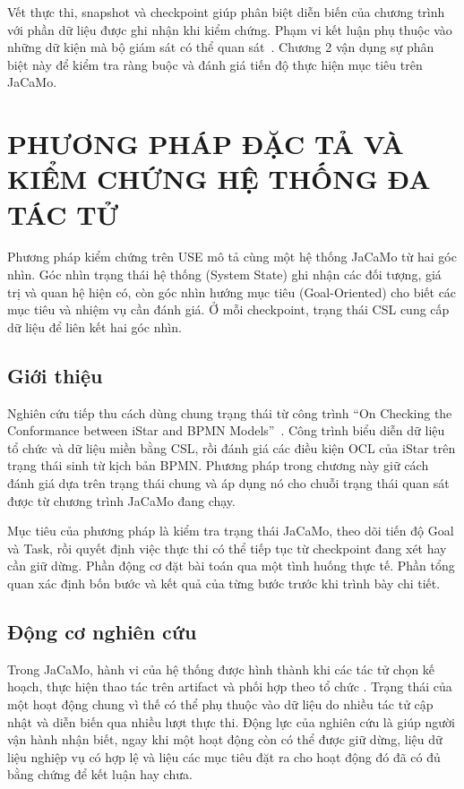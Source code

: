\documentclass[12pt,a4paper,oneside]{extreport}
\begin{document}
Vết thực thi, snapshot và checkpoint giúp phân biệt diễn biến của chương trình với phần dữ liệu được ghi nhận khi kiểm chứng. Phạm vi kết luận phụ thuộc vào những dữ kiện mà bộ giám sát có thể quan sát~\cite{ref-23}. Chương 2 vận dụng sự phân biệt này để kiểm tra ràng buộc và đánh giá tiến độ thực hiện mục tiêu trên JaCaMo.

\chapter{PHƯƠNG PHÁP ĐẶC TẢ VÀ KIỂM CHỨNG HỆ THỐNG ĐA TÁC TỬ}\label{sec:2}

Phương pháp kiểm chứng trên USE mô tả cùng một hệ thống JaCaMo từ hai góc nhìn. Góc nhìn trạng thái hệ thống (System State) ghi nhận các đối tượng, giá trị và quan hệ hiện có, còn góc nhìn hướng mục tiêu (Goal-Oriented) cho biết các mục tiêu và nhiệm vụ cần đánh giá. Ở mỗi checkpoint, trạng thái CSL cung cấp dữ liệu để liên kết hai góc nhìn.

\section{Giới thiệu}\label{sec:2-1}

Nghiên cứu tiếp thu cách dùng chung trạng thái từ công trình ``On Checking the Conformance between iStar and BPMN Models''~\cite{ref-28}. Công trình biểu diễn dữ liệu tổ chức và dữ liệu miền bằng CSL, rồi đánh giá các điều kiện OCL của iStar trên trạng thái sinh từ kịch bản BPMN. Phương pháp trong chương này giữ cách đánh giá dựa trên trạng thái chung và áp dụng nó cho chuỗi trạng thái quan sát được từ chương trình JaCaMo đang chạy.

Mục tiêu của phương pháp là kiểm tra trạng thái JaCaMo, theo dõi tiến độ Goal và Task, rồi quyết định việc thực thi có thể tiếp tục từ checkpoint đang xét hay cần giữ dừng. Phần động cơ đặt bài toán qua một tình huống thực tế. Phần tổng quan xác định bốn bước và kết quả của từng bước trước khi trình bày chi tiết.

\section{Động cơ nghiên cứu}\label{sec:2-2}

Trong JaCaMo, hành vi của hệ thống được hình thành khi các tác tử chọn kế hoạch, thực hiện thao tác trên artifact và phối hợp theo tổ chức \cite{ref-2}. Trạng thái của một hoạt động chung vì thế có thể phụ thuộc vào dữ liệu do nhiều tác tử cập nhật và diễn biến qua nhiều lượt thực thi. Động lực của nghiên cứu là giúp người vận hành nhận biết, ngay khi một hoạt động còn có thể được giữ dừng, liệu dữ liệu nghiệp vụ có hợp lệ và liệu các mục tiêu đặt ra cho hoạt động đó đã có đủ bằng chứng để kết luận hay chưa.
\end{document}
